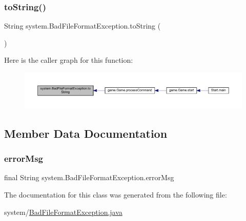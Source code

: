 \mbox{\label{classsystem_1_1_bad_file_format_exception_a76ab38238a81d1bfc6473cbee69c151f}} 
\subsubsection{\texorpdfstring{to\+String()}{toString()}}
{\footnotesize\ttfamily String system.\+Bad\+File\+Format\+Exception.\+to\+String (\begin{DoxyParamCaption}{ }\end{DoxyParamCaption})\hspace{0.3cm}{\ttfamily [inline]}}

Here is the caller graph for this function\+:
\nopagebreak
\begin{figure}[H]
\begin{center}
\leavevmode
\includegraphics[width=350pt]{classsystem_1_1_bad_file_format_exception_a76ab38238a81d1bfc6473cbee69c151f_icgraph}
\end{center}
\end{figure}


\subsection{Member Data Documentation}
\mbox{\label{classsystem_1_1_bad_file_format_exception_a47a4ec3e74c77f1e0378f0757f20515a}} 
\subsubsection{\texorpdfstring{error\+Msg}{errorMsg}}
{\footnotesize\ttfamily final String system.\+Bad\+File\+Format\+Exception.\+error\+Msg\hspace{0.3cm}{\ttfamily [private]}}



The documentation for this class was generated from the following file\+:\begin{DoxyCompactItemize}
\item 
system/\mbox{\hyperlink{_bad_file_format_exception_8java}{Bad\+File\+Format\+Exception.\+java}}\end{DoxyCompactItemize}
